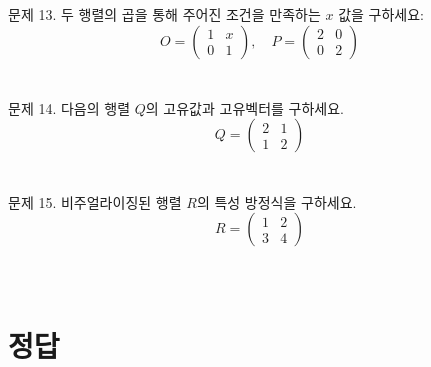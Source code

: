 \documentclass[fleqn]{article}
\begin{document}
\noindent 문제 13. 두 행렬의 곱을 통해 주어진 조건을 만족하는 $x$ 값을 구하세요: $$O = \begin{pmatrix} 1 & x \\ 0 & 1 \end{pmatrix}, \quad P = \begin{pmatrix} 2 & 0 \\ 0 & 2 \end{pmatrix}$$ \\\\

\noindent 문제 14. 다음의 행렬 $Q$의 고유값과 고유벡터를 구하세요. $$Q = \begin{pmatrix} 2 & 1 \\ 1 & 2 \end{pmatrix}$$ \\\\

\noindent 문제 15. 비주얼라이징된 행렬 $R$의 특성 방정식을 구하세요. $$R = \begin{pmatrix} 1 & 2 \\ 3 & 4 \end{pmatrix}$$ \\\\

\section*{정답}
\end{document}
